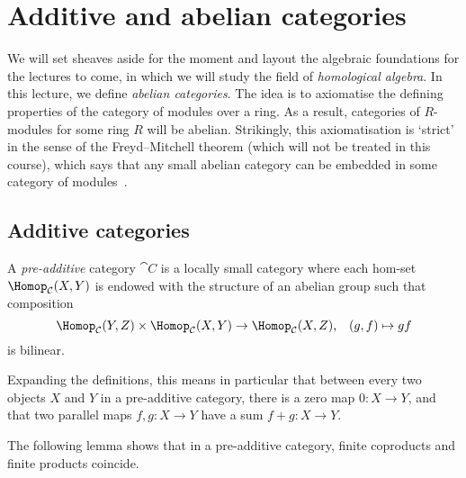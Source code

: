 \documentclass[../main.tex]{subfiles}
\begin{document}
\chapter{Additive and abelian categories}
We will set sheaves aside for the moment and layout the algebraic foundations for the lectures to come, in which we will study the field of \emph{homological algebra}.
In this lecture, we define \emph{abelian categories}.
The idea is to axiomatise the defining properties of the category of modules over a ring.
As a result, categories of \(R\)-modules for some ring \(R\) will be abelian.
Strikingly, this axiomatisation is `strict' in the sense of the Freyd--Mitchell theorem (which will not be treated in this course), which says that any small abelian category can be embedded in some category of modules~\cite[Theorem~1.6.1]{WeibelHomologicalAlgebra}. 

\section{Additive categories}
\begin{defn}
A \emph{pre-additive} category $\cat C$ is a locally small category where each hom-set $\Hom_{\cat C}(X, Y)$ is endowed with the structure of an abelian group such that composition
\[ \Hom[\cat C](Y,Z)\times\Hom[\cat C](X,Y) \to \Hom[\cat C](X,Z)\text{,} \quad (g,f)\mapsto gf \]
is bilinear.
\end{defn}

Expanding the definitions, this means in particular that between every two objects \(X\) and \(Y\) in a pre-additive category, there is a zero map \(0\colon X\to Y\), and that two parallel maps \(f,g\colon X\to Y\) have a sum \(f+g\colon X\to Y\).

The following lemma shows that in a pre-additive category, finite coproducts and finite products coincide.
\end{document}
